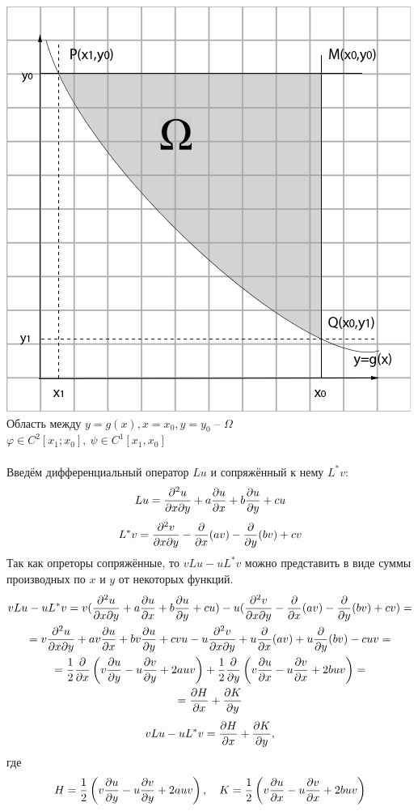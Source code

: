 \documentclass[../main.tex]{subfiles}
\begin{document}
\includegraphics[scale=0.6]{2.7_graph.jpg}    
\\
Область между $y=g(x), x=x_0, y=y_0$ -- $\Omega$\\
$\varphi \in C^2[x_1; x_0], \: \psi \in C^1[x_1,x_0]$\\
\\
Введём дифференциальный оператор $Lu$ и сопряжённый к нему $L^*v$:
$$ Lu = \pderivtwo{u}{x}{y} + a\pderiv{u}{x} +b\pderiv{u}{y} + cu $$
$$ L^*v = \pderivtwo{v}{x}{y} -\pderiv{ }{x}(av) -\pderiv{ }{y}(bv) + cv $$
Так как опреторы сопряжённые, то $vLu - uL^*v$ можно представить в виде
суммы производных по $x$ и $y$ от некоторых функций.
\begin{gather*}
    vLu - uL^*v =
    v(\pderivtwo{u}{x}{y} + a\pderiv{u}{x} +b\pderiv{u}{y} + cu) -
    u(\pderivtwo{v}{x}{y} -\pderiv{ }{x}(av) -\pderiv{ }{y}(bv) + cv) =\\
    = v\pderivtwo{u}{x}{y} + av\pderiv{u}{x} +bv\pderiv{u}{y} + cvu -
    u\pderivtwo{v}{x}{y} +u\pderiv{ }{x}(av) +u\pderiv{ }{y}(bv) - cuv = \\
    =\frac{1}{2} \pderiv{ }{x} \left( v\pderiv{u}{y} - u\pderiv{v}{y} + 2auv\right) + 
    \frac{1}{2} \pderiv{ }{y} \left( v\pderiv{u}{x} - u\pderiv{v}{x} + 2buv\right) =\\
    = \pderiv{H}{x}+\pderiv{K}{y}
\end{gather*}
\begin{equation}
    \label{eq:2.7.3}
    vLu - uL^*v = \frac{\partial H}{\partial x}+\frac{\partial K}{\partial y},
\end{equation}
где
\begin{equation}
    \label{eq:2.7.4}
    H = \frac{1}{2} \left( v\frac{\partial u}{\partial y} - u\frac{\partial v}{\partial y} + 2auv\right), \quad
    K = \frac{1}{2}\left( v\frac{\partial u}{\partial x} - u\frac{\partial v}{\partial x} + 2buv\right)
\end{equation}
\end{document}
